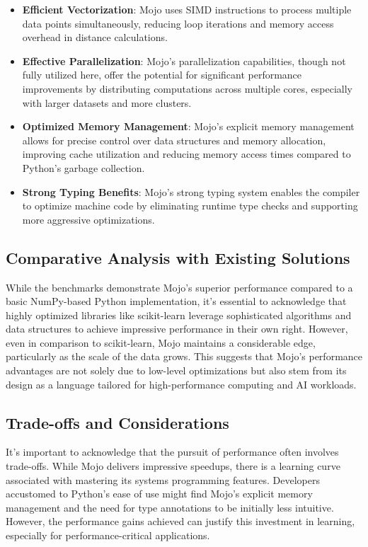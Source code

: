 \documentclass[conference]{IEEEtran}
\begin{document}
\begin{itemize}
    \item \textbf{Efficient Vectorization}: Mojo uses SIMD instructions to process multiple data points simultaneously, reducing loop iterations and memory access overhead in distance calculations.

    \item \textbf{Effective Parallelization}: Mojo's parallelization capabilities, though not fully utilized here, offer the potential for significant performance improvements by distributing computations across multiple cores, especially with larger datasets and more clusters.

    \item \textbf{Optimized Memory Management}: Mojo's explicit memory management allows for precise control over data structures and memory allocation, improving cache utilization and reducing memory access times compared to Python's garbage collection.

    \item \textbf{Strong Typing Benefits}: Mojo's strong typing system enables the compiler to optimize machine code by eliminating runtime type checks and supporting more aggressive optimizations.
\end{itemize}

\subsection{Comparative Analysis with Existing Solutions}
While the benchmarks demonstrate Mojo's superior performance compared to a basic NumPy-based Python implementation, it's essential to acknowledge that highly optimized libraries like scikit-learn leverage sophisticated algorithms and data structures to achieve impressive performance in their own right. However, even in comparison to scikit-learn, Mojo maintains a considerable edge, particularly as the scale of the data grows. This suggests that Mojo's performance advantages are not solely due to low-level optimizations but also stem from its design as a language tailored for high-performance computing and AI workloads.

\subsection{Trade-offs and Considerations}
It's important to acknowledge that the pursuit of performance often involves trade-offs. While Mojo delivers impressive speedups, there is a learning curve associated with mastering its systems programming features. Developers accustomed to Python's ease of use might find Mojo's explicit memory management and the need for type annotations to be initially less intuitive. However, the performance gains achieved can justify this investment in learning, especially for performance-critical applications.
\end{document}
